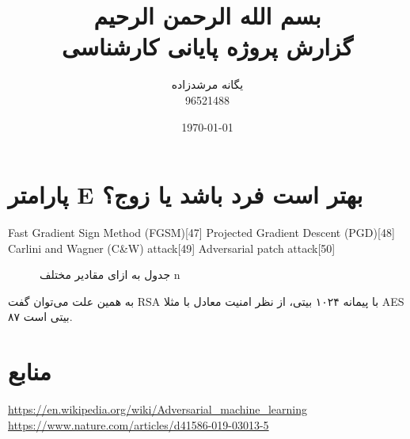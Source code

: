 \documentclass[11pt]{article}
\title{
	بسم الله الرحمن الرحیم
	\\[25pt]
	گزارش پروژه پایانی کارشناسی
}
\author{
یگانه مرشدزاده
	\\[10pt]
	96521488
}
\date{\today}
\begin{document}
\maketitle
\begin{persian}
	
\newpage
{}
\tableofcontents
\newpage
\listoffigures

\newpage
\section{
پارامتر E بهتر است فرد باشد یا زوج؟ 
}
    Fast Gradient Sign Method (FGSM)[47]
Projected Gradient Descent (PGD)[48]
Carlini and Wagner (C&W) attack[49]
Adversarial patch attack[50]

\begin{figure}[H]
	\caption{جدول به ازای مقادیر مختلف n}
	\label{table}
\end{figure}
به همین علت می‌توان گفت RSA با پیمانه ۱۰۲۴ بیتی، از نظر امنیت معادل با مثلا AES ۸۷ بیتی است.\\


\newpage
\section{منابع}
\begin{flushleft}
	\url{https://en.wikipedia.org/wiki/Adversarial_machine_learning}\\
	\url{https://www.nature.com/articles/d41586-019-03013-5}
\end{flushleft}

\end{persian}
\end{document}
